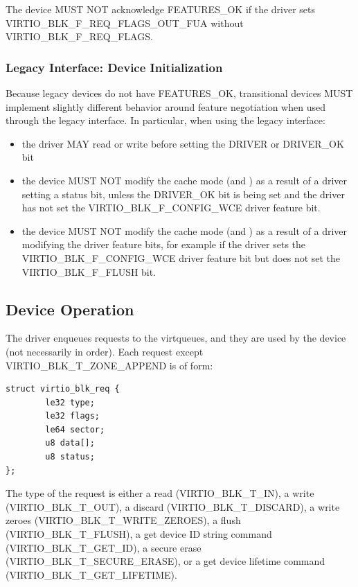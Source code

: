 The device MUST NOT acknowledge FEATURES_OK if the driver sets
VIRTIO_BLK_F_REQ_FLAGS_OUT_FUA without VIRTIO_BLK_F_REQ_FLAGS.

\subsubsection{Legacy Interface: Device Initialization}\label{sec:Device Types / Block Device / Device Initialization / Legacy Interface: Device Initialization}

Because legacy devices do not have FEATURES_OK, transitional devices
MUST implement slightly different behavior around feature negotiation
when used through the legacy interface.  In particular, when using the
legacy interface:

\begin{itemize}
\item the driver MAY read or write  before setting
  the DRIVER or DRIVER_OK  bit

\item the device MUST NOT modify the cache mode (and )
  as a result of a driver setting a status bit, unless
  the DRIVER_OK bit is being set and the driver has not set the
  VIRTIO_BLK_F_CONFIG_WCE driver feature bit.

\item the device MUST NOT modify the cache mode (and )
  as a result of a driver modifying the driver feature bits, for example
  if the driver sets the VIRTIO_BLK_F_CONFIG_WCE driver feature bit but
  does not set the VIRTIO_BLK_F_FLUSH bit.
\end{itemize}


\subsection{Device Operation}\label{sec:Device Types / Block Device / Device Operation}

The driver enqueues requests to the virtqueues, and they are used by
the device (not necessarily in order). Each request except
VIRTIO_BLK_T_ZONE_APPEND is of form:

\begin{lstlisting}
struct virtio_blk_req {
        le32 type;
        le32 flags;
        le64 sector;
        u8 data[];
        u8 status;
};
\end{lstlisting}

The type of the request is either a read (VIRTIO_BLK_T_IN), a write
(VIRTIO_BLK_T_OUT), a discard (VIRTIO_BLK_T_DISCARD), a write zeroes
(VIRTIO_BLK_T_WRITE_ZEROES), a flush (VIRTIO_BLK_T_FLUSH), a get device ID
string command (VIRTIO_BLK_T_GET_ID), a secure erase
(VIRTIO_BLK_T_SECURE_ERASE), or a get device lifetime command
(VIRTIO_BLK_T_GET_LIFETIME).

